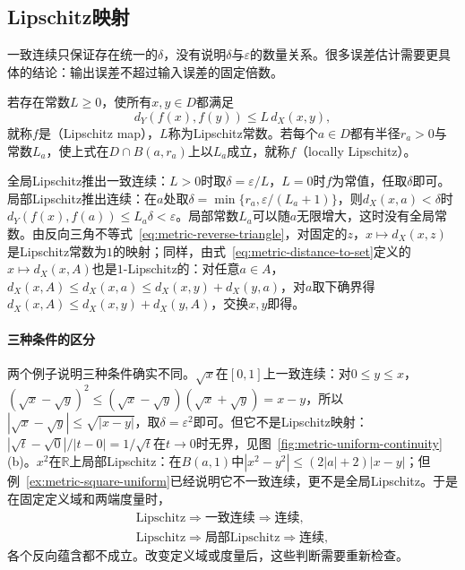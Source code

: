 \subsection{Lipschitz映射}
\label{sec:metric-lipschitz}

一致连续只保证存在统一的$\delta$，没有说明$\delta$与$\varepsilon$的数量关系。很多误差估计需要更具体的结论：输出误差不超过输入误差的固定倍数。

\begin{definition}[Lipschitz映射]
\label{def:metric-lipschitz}
若存在常数$L\geq0$，使所有$x,y\in D$都满足
\[
  d_Y(f(x),f(y))\leq L\,d_X(x,y),
\]
就称$f$是（Lipschitz map），$L$称为Lipschitz常数。若每个$a\in D$都有半径$r_a>0$与常数$L_a$，使上式在$D\cap B(a,r_a)$上以$L_a$成立，就称$f$（locally Lipschitz）。
\end{definition}

全局Lipschitz推出一致连续：$L>0$时取$\delta=\varepsilon/L$，$L=0$时$f$为常值，任取$\delta$即可。局部Lipschitz推出连续：在$a$处取$\delta=\min\{r_a,\varepsilon/(L_a+1)\}$，则$d_X(x,a)<\delta$时$d_Y(f(x),f(a))\leq L_a\delta<\varepsilon$。局部常数$L_a$可以随$a$无限增大，这时没有全局常数。由反向三角不等式~\eqref{eq:metric-reverse-triangle}，对固定的$z$，$x\mapsto d_X(x,z)$是Lipschitz常数为$1$的映射；同样，由式~\eqref{eq:metric-distance-to-set}定义的$x\mapsto d_X(x,A)$也是$1$-Lipschitz的：对任意$a\in A$，$d_X(x,A)\leq d_X(x,a)\leq d_X(x,y)+d_X(y,a)$，对$a$取下确界得$d_X(x,A)\leq d_X(x,y)+d_X(y,A)$，交换$x,y$即得。

\paragraph{三种条件的区分}
两个例子说明三种条件确实不同。$\sqrt x$在$[0,1]$上一致连续：对$0\leq y\leq x$，$(\sqrt x-\sqrt y)^2\leq(\sqrt x-\sqrt y)(\sqrt x+\sqrt y)=x-y$，所以$|\sqrt x-\sqrt y|\leq\sqrt{|x-y|}$，取$\delta=\varepsilon^2$即可。但它不是Lipschitz映射：$|\sqrt t-\sqrt0|/|t-0|=1/\sqrt t$在$t\to0$时无界，见图~\ref{fig:metric-uniform-continuity}(b)。$x^2$在$\mathbb R$上局部Lipschitz：在$B(a,1)$中$|x^2-y^2|\leq(2|a|+2)|x-y|$；但例~\ref{ex:metric-square-uniform}已经说明它不一致连续，更不是全局Lipschitz。于是在固定定义域和两端度量时，
\[
  \begin{gathered}
    \text{Lipschitz}\Longrightarrow\text{一致连续}\Longrightarrow\text{连续},\\
    \text{Lipschitz}\Longrightarrow\text{局部Lipschitz}\Longrightarrow\text{连续},
  \end{gathered}
\]
各个反向蕴含都不成立。改变定义域或度量后，这些判断需要重新检查。

